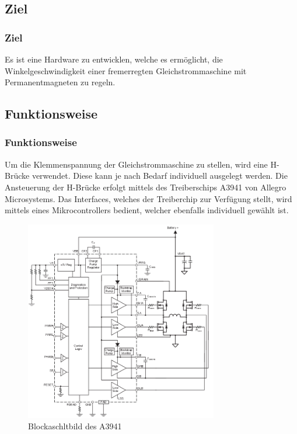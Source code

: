\ifSTANDALONE
\subsection{Ziel}
\fi
\ifEMBED
\subsubsection{Ziel}
\fi
Es ist eine Hardware zu entwicklen, welche es ermöglicht, die
Winkelgeschwindigkeit einer fremerregten Gleichstrommaschine mit
Permanentmagneten zu regeln.

\ifSTANDALONE
\subsection{Funktionsweise}
\fi
\ifEMBED
\subsubsection{Funktionsweise}
\fi
Um die Klemmenspannung der Gleichstrommaschine zu stellen, wird eine
H-Brücke verwendet. Diese kann je nach Bedarf individuell ausgelegt
werden. Die Ansteuerung der H-Brücke erfolgt mittels des Treiberschips
A3941 von Allegro Microsystems. Das Interfaces, welches der
Treiberchip zur Verfügung stellt, wird mittels eines Mikrocontrollers
bedient, welcher ebenfalls individuell gewählt ist.

\begin{figure}[h!]
	\centering
	\includegraphics[width=0.75\textwidth]{src/DC/fig/a3941-functional.png}
	\caption{Blockaschltbild des A3941}
	\label{fig:a3941-functional}
\end{figure}


